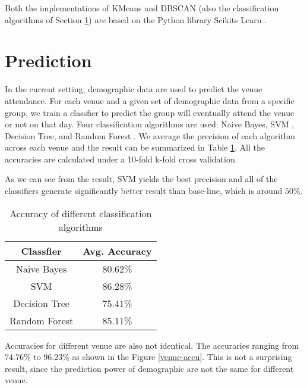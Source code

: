 \documentclass[12pt]{article}
\begin{document}
Both the implementations of KMeans and DBSCAN (also the classification algorithms of Section \ref{prediction}) are based on the Python library Scikits Learn \cite{sklearn}.

\section{Prediction}\label{prediction}

In the current setting, demographic data are used to predict the venue attendance. For each venue and a given set of demographic data from a specific group, we train a classfier to predict the group will eventually attend the venue or not on that day. Four classification algorithms are used: Naive Bayes, SVM \cite{Cortes95}, Decision Tree, and Random Forest \cite{Breiman01}. We average the precision of each algorithm across each venue and the result can be summarized in Table \ref{class-accu}. All the accuracies are calculated under a 10-fold k-fold cross validation.

As we can see from the result, SVM yields the best precision and all of the classifiers generate significantly better result than base-line, which is around $50\%$. 

\begin{table}
\begin{center}
    \begin{tabular}{ | c | c | }
        \hline
        \textbf {Classfier} & \textbf{Avg. Accuracy} \\ \hline
        \hline
        Naive Bayes     & 80.62\% \\ \hline
        SVM             & 86.28\% \\ \hline
        Decision Tree   & 75.41\% \\ \hline
        Random Forest   & 85.11\% \\ \hline
    \end{tabular}
\caption{Accuracy of different classification algorithms}
\label{class-accu}
\end{center}
\end{table}

Accuracies for different venue are also not identical. The accuraries ranging from $74.76\%$ to $96.23\%$ as shown in the Figure \ref{venue-accu}. This is not a surprising result, since the prediction power of demographic are not the same for different venue.
\end{document}
